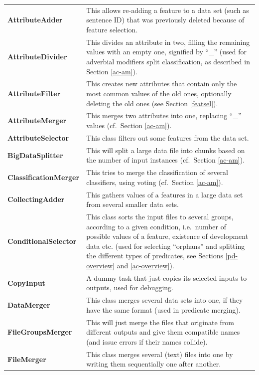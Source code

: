 \documentclass[12pt,notitlepage,a4paper]{report}
\begin{document}
\footnotesize
\renewcommand{\arraystretch}{1.5}
\begin{longtable}{p{}p{}}
\bf AttributeAdder & This allows re-adding a feature to a data set (such as sentence ID) that was previously deleted because of feature selection. \\
\bf AttributeDivider & This divides an attribute in two, filling the remaining values with an empty one, signified by ``\_'' (used for adverbial modifiers split classification, as described in Section \ref{ac-am}). \\
\bf AttributeFilter & This creates new attributes that contain only the most common values of the old ones, optionally deleting the old ones (see Section \ref{featsel}). \\
\bf AttributeMerger & This merges two attributes into one, replacing ``\_'' values (cf.\ Section \ref{ac-am}). \\
\bf AttributeSelector & This class filters out some features from the data set. \\
\bf BigDataSplitter & This will split a large data file into chunks based on the number of input instances (cf.\ Section \ref{ac-am}). \\
\bf ClassificationMerger & This tries to merge the classification of several classifiers, using voting (cf.\ Section \ref{ac-am}). \\
\bf CollectingAdder & This gathers values of a features in a large data set from several smaller data sets. \\
\bf ConditionalSelector & This class sorts the input files to several groups, according to a given condition, i.e.\ number of possible values of a feature, existence of development data etc. (used for selecting ``orphans'' and splitting the different types of predicates, see Sections \ref{pd-overview} and \ref{ac-overview}). \\
\bf CopyInput & A dummy task that just copies its selected inputs to outputs, used for debugging. \\
\bf DataMerger & This class merges several data sets into one, if they have the same format (used in predicate merging). \\
\bf FileGroupsMerger & This will just merge the files that originate from different outputs and give them compatible names (and issue errors if their names collide). \\
\bf FileMerger & This class merges several (text) files into one by writing them sequentially one after another. \\

\end{longtable}
\end{document}
